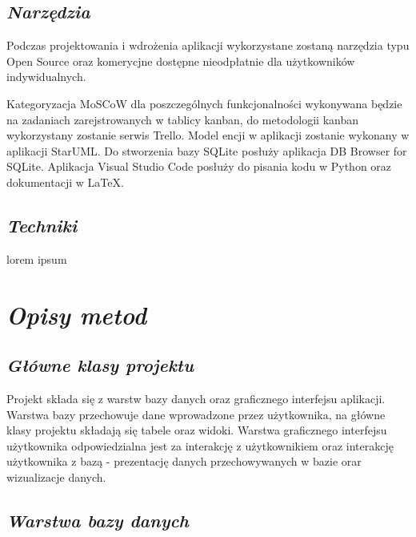 \documentclass[a4paper,10pt]{report}
\newcommand{\customstylechapter}[1]{\large{\textit{#1}}}
\newcommand{\customstylesection}[1]{\textbf{\textit{#1}}}
\begin{document}
\section{\customstylesection{Narzędzia}}
{Podczas projektowania i wdrożenia aplikacji wykorzystane zostaną narzędzia typu
 Open Source oraz komerycjne dostępne nieodpłatnie dla użytkowników 
indywidualnych.}

{Kategoryzacja MoSCoW dla poszczególnych funkcjonalności wykonywana będzie na 
zadaniach zarejstrowanych w tablicy kanban, do metodologii kanban wykorzystany 
zostanie serwis Trello. Model encji w aplikacji zostanie wykonany w aplikacji 
StarUML. Do stworzenia bazy SQLite posłuży aplikacja DB Browser for SQLite. 
Aplikacja Visual Studio Code posłuży do pisania kodu w Python oraz dokumentacji 
w LaTeX.}

\section{\customstylesection{Techniki}}
{lorem ipsum}

\chapter{\customstylechapter{Opisy metod}}
\section{\customstylesection{Główne klasy projektu}}
{Projekt składa się z warstw bazy danych oraz graficznego interfejsu aplikacji. 
Warstwa bazy przechowuje dane wprowadzone przez użytkownika, na główne klasy 
projektu składają się tabele oraz widoki. Warstwa graficznego interfejsu 
użytkownika odpowiedzialna jest za interakcję z użytkownikiem oraz interakcję
 użytkownika z bazą - prezentację danych przechowywanych w bazie orar 
 wizualizacje danych.}

\section{\customstylesection{Warstwa bazy danych}}
\end{document}
